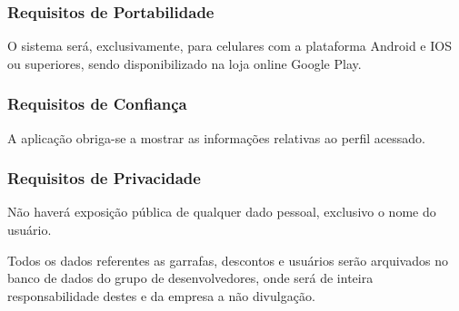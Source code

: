 \subsubsection{Requisitos de Portabilidade}
O sistema será, exclusivamente, para celulares com a plataforma Android e IOS ou superiores, sendo disponibilizado na loja online Google Play.

\subsubsection{Requisitos de Confiança}
A aplicação obriga-se a mostrar as informações relativas ao perfil acessado.

\subsubsection{Requisitos de Privacidade}
Não haverá exposição pública de qualquer dado pessoal, exclusivo o nome do usuário.

Todos os dados referentes as garrafas, descontos e usuários serão arquivados no banco de dados do grupo de desenvolvedores, onde será de inteira responsabilidade destes e da empresa a não divulgação.

